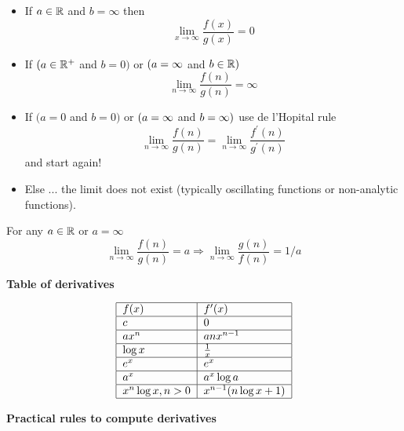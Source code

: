\documentclass[justified,sixbynine]{tufte-book}
\def\subsubsection#1{{\bf #1}}
\theoremstyle{plain}%
\theoremstyle{definition}
\theoremstyle{remark}
\begin{document}
\begin{fullwidth}
\begin{itemize}
\item  If $a\in {\Bbb R}$ and $b=\infty $ then
\begin{equation}
\lim_{x\rightarrow \infty }\frac{f(x)}{g(x)}=0
\end{equation}

\item  If $(a\in {\Bbb R}^{+}$ and $b=0)$ or $(a={\Bbb \infty }$ and $b\in
{\Bbb R})$
\begin{equation}
\lim_{n\rightarrow \infty }\frac{f(n)}{g(n)}=\infty
\end{equation}

\item  If $(a=0$ and $b=0)$ or $(a={\Bbb \infty }$ and $b={\Bbb \infty })$
use de l'Hopital rule
\begin{equation}
\lim_{n\rightarrow \infty }\frac{f(n)}{g(n)}=\lim_{n\rightarrow \infty }%
\frac{f^{\prime }(n)}{g^{\prime }(n)}
\end{equation}
and start again!

\item  Else ... the limit does not exist (typically oscillating functions or
non-analytic functions).
\end{itemize}

For any $a\in {\Bbb R}$ or $a=\infty $%
\begin{equation}
\lim_{n\rightarrow \infty }\frac{f(n)}{g(n)}=a\Rightarrow \lim_{n\rightarrow
\infty }\frac{g(n)}{f(n)}=1/a
\end{equation}

\subsubsection{Table of derivatives}

\begin{equation}
\begin{tabular}{|l|l|}
\hline
$f(x)$ & $f^{\prime }(x)$ \\ \hline
$c$ & $0$ \\ \hline
$ax^n$ & $anx^{n-1}$ \\ \hline
$\log x$ & $\frac 1x$ \\ \hline
$e^x$ & $e^x$ \\ \hline
$a^x$ & $a^x\log a$ \\ \hline
$x^n\log x,n>0$ & $x^{n-1}(n\log x+1)$ \\ \hline
\end{tabular}
\end{equation}

\subsubsection{Practical rules to compute derivatives}


\end{fullwidth}
\end{document}
